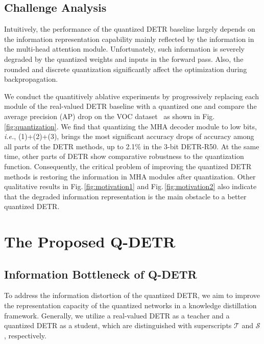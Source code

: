 \documentclass[10pt,twocolumn,letterpaper]{article}
\begin{document}
\subsection{Challenge Analysis}
%
Intuitively, the performance of the quantized DETR baseline largely depends on the information representation capability mainly reflected by the information in the multi-head attention module. 
%
Unfortunately, such information is severely degraded by the quantized weights and inputs in the forward pass. Also, the rounded and discrete quantization significantly affect the optimization during backpropagation. 


We conduct the quantitively ablative experiments by progressively replacing each module of the real-valued DETR baseline with a quantized one and compare the average precision (AP) drop on the VOC dataset~\cite{voc2007} as shown in Fig.\,\ref{fig:quantization}. 
We find that quantizing the MHA decoder module to low bits, {\em i.e.}, (1)+(2)+(3), brings the most significant accuracy drops of accuracy among all parts of the DETR methods, up to 2.1\% in the 3-bit DETR-R50. At the same time, other parts of DETR show comparative robustness to the quantization function. 
Consequently, the critical problem of improving the quantized DETR methods is restoring the information in MHA modules after quantization. Other qualitative results in Fig.\,\ref{fig:motivation1} and Fig.\,\ref{fig:motivation2} also indicate that the degraded information representation is the main obstacle to a better quantized DETR.

\section{The Proposed Q-DETR}

\subsection{Information Bottleneck of Q-DETR}

To address the information distortion of the quantized DETR, we aim to improve the representation capacity of the quantized networks in a knowledge distillation framework. Generally, we utilize a real-valued DETR as a teacher and a quantized DETR as a student, which are distinguished with superscripts $\mathcal{T}$ and $\mathcal{S}$, respectively.
%
\end{document}
